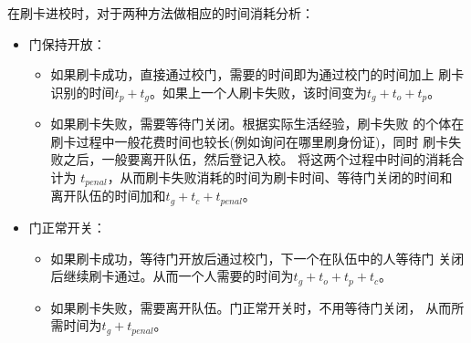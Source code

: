 在刷卡进校时，对于两种方法做相应的时间消耗分析：
\begin{itemize}
    \item 门保持开放：
    \begin{itemize}
        \item 如果刷卡成功，直接通过校门，需要的时间即为通过校门的时间加上
        刷卡识别的时间$t_p+t_g$。如果上一个人刷卡失败，该时间变为$t_g+t_o+t_p$。
        \item 如果刷卡失败，需要等待门关闭。根据实际生活经验，刷卡失败
        的个体在刷卡过程中一般花费时间也较长(例如询问在哪里刷身份证)，同时
        刷卡失败之后，一般要离开队伍，然后登记入校。
        将这两个过程中时间的消耗合计为
        $t_{penal}$，从而刷卡失败消耗的时间为刷卡时间、等待门关闭的时间和
        离开队伍的时间加和$t_g+t_c+t_{penal}$。
    \end{itemize}
    \item 门正常开关：
    \begin{itemize}
        \item 如果刷卡成功，等待门开放后通过校门，下一个在队伍中的人等待门
        关闭后继续刷卡通过。从而一个人需要的时间为$t_g+t_o+t_p+t_c$。
        \item 如果刷卡失败，需要离开队伍。门正常开关时，不用等待门关闭，
        从而所需时间为$t_g+t_{penal}$。
    \end{itemize}
\end{itemize}

